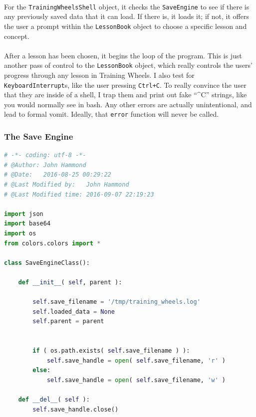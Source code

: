 \documentclass[11pt]{article}
\begin{document}
	\paragraph{} For the \texttt{TrainingWheelsShell} object, it checks the \texttt{SaveEngine} to see if there is any previously saved data that it can load. If there is, it loads it; if not, it offers the user a prompt within the \texttt{LessonBook} object to choose a specific lesson and concept.

	\paragraph{} After a lesson has been chosen, it begins the loop of the program. This is just another pass of control to the \texttt{LessonBook} object, which really controls the users' progress through any lesson in Training Wheels. I also test for \texttt{KeyboardInterrupt}s, like the user pressing \texttt{Ctrl+C}. To really convince the user that they are inside of a shell, I trap them and print out fake ``\^{}C'' strings, like you would normally see in bash. Any other errors are actually unintentional, and lead to formal vomit. Ideally, that \texttt{error} function will never be called.

	\newpage

	\subsubsection{The Save Engine}

	\begin{lstlisting}[language=Python]
# -*- coding: utf-8 -*-
# @Author: John Hammond
# @Date:   2016-08-25 00:29:22
# @Last Modified by:   John Hammond
# @Last Modified time: 2016-09-07 22:19:23

import json
import base64
import os
from colors.colors import *

class SaveEngineClass():

	def __init__( self, parent ):

		self.save_filename = '/tmp/training_wheels.log'
		self.loaded_data = None
		self.parent = parent
		

		if ( os.path.exists( self.save_filename ) ):
			self.save_handle = open( self.save_filename, 'r' )
		else:
			self.save_handle = open( self.save_filename, 'w' )

	def __del__( self ):
		self.save_handle.close()

	\end{lstlisting}
\end{document}
